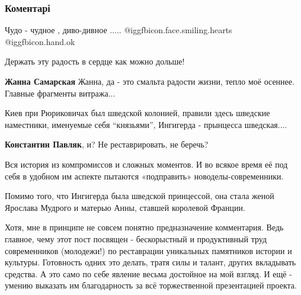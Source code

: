  
 
 
 
 
\subsubsection{Коментарі}
\label{sec:19_11_2021.fb.zadorozhnaja_natalia.1.skazka_sofia_1.cmt}

\begin{itemize} %
Чудо - чудное , диво-дивное ..... @igg{fbicon.face.smiling.hearts}  @igg{fbicon.hand.ok} 

Держать эту радость в сердце как можно дольше!

\begin{itemize} %
\textbf{Жанна Самарская}
Жанна, да - это смальта радости жизни, тепло моё осеннее. Главные фрагменты витража...
\end{itemize} %


Киев при Рюриковичах был шведской колонией, правили здесь шведские наместники, именуемые себя \enquote{князьями},
Ингигерда - прынцесса шведская....

\begin{itemize} %
\textbf{Константин Павляк}, и? Не реставрировать, не беречь?

Вся история из компромиссов и сложных моментов. И во всякое время её под себя в
удобном им аспекте пытаются «подправить» новоделы-современники.

Помимо того, что Ингигерда была шведской принцессой, она стала женой Ярослава
Мудрого и матерью Анны, ставшей королевой Франции.

Хотя, мне в принципе не совсем понятно предназначение комментария. Ведь
главное, чему этот пост посвящен - бескорыстный и продуктивный труд
современников (молодежи!) по реставрации уникальных памятников истории и
культуры. Готовность одних это делать, тратя силы и талант, других вкладывать
средства. А это само по себе явление весьма достойное на мой взгляд. И ещё -
умению выказать им благодарность за всё торжественной презентацией проекта.



\end{itemize}
\end{itemize}
